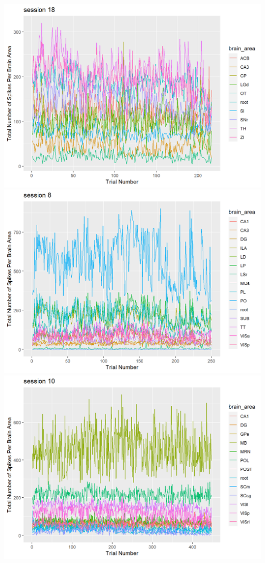 \documentclass[
]{article}
\begin{document}
\includegraphics{images/unnamed-chunk-7-1.png}
\includegraphics{images/unnamed-chunk-7-2.png}
\includegraphics{images/unnamed-chunk-7-3.png}
\end{document}

